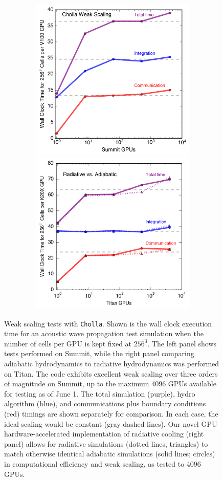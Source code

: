 \documentclass[11pt,letterpaper,english]{article}
\begin{document}
\begin{figure}[h]
\centering
\includegraphics[width=4.52in, height=3.08in, keepaspectratio=true]{../scaling/weak_scaling_adiabatic.png}
\includegraphics[width=4.52in, height=3.08in, keepaspectratio=true]{weak_scaling_radiative.png}
\caption{Weak scaling tests with {\tt Cholla}. Shown is the wall clock execution time for an acoustic wave propagation test simulation when the number of cells per GPU is kept fixed at $256^3$. The left panel shows tests performed on Summit, while the right panel comparing adiabatic hydrodynamics to radiative hydrodynamics was performed on Titan.
The code exhibits excellent weak scaling over three orders of magnitude on Summit, up to the maximum 4096 GPUs available for testing as of June 1. The total simulation (purple), hydro algorithm (blue), and communications plus boundary conditions (red) timings are shown separately for comparison. In each case, the ideal scaling would be constant (gray dashed lines). Our novel GPU hardware-accelerated implementation of radiative cooling (right panel) allows for radiative simulations (dotted lines, triangles) to match otherwise identical 
adiabatic simulations (solid lines; circles) in computational efficiency and weak scaling, as tested to 4096 GPUs.}
\label{fig:weak_scaling}
\end{figure}
\end{document}
